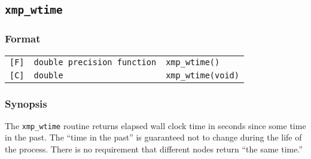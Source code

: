 %
%
%
%
%

\subsection{\tt xmp\_wtime}

\subsubsection*{Format}

\begin{tabular}{lll}
\verb![F]!&  {\tt double precision function}& {\tt xmp\_wtime()}\\
\verb![C]!&  {\tt double}& {\tt xmp\_wtime(void)}
\end{tabular}

\subsubsection*{Synopsis}
The {\tt xmp\_wtime} routine returns elapsed wall clock time in seconds 
since some time in the past. The ``time in the past'' is guaranteed
not to change during the life of the process.
There is no requirement that different nodes return ``the same time.''


